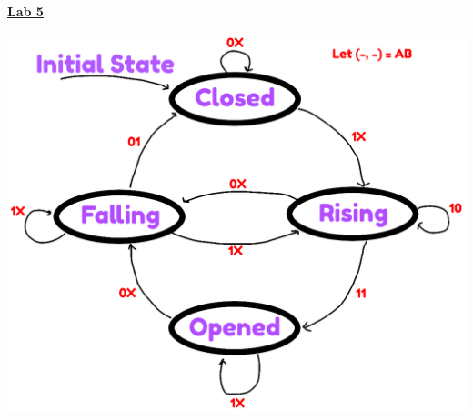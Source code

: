 \documentclass[12pt]{article}
\begin{document}
{\LARGE \noindent \underline{\textbf{Lab 5}}}
\begin{center}
    \includegraphics[width=14cm]{CSCB58_Lab5_StateDiagram.png} %
    \\[1.5cm]


\end{center}
\end{document}
